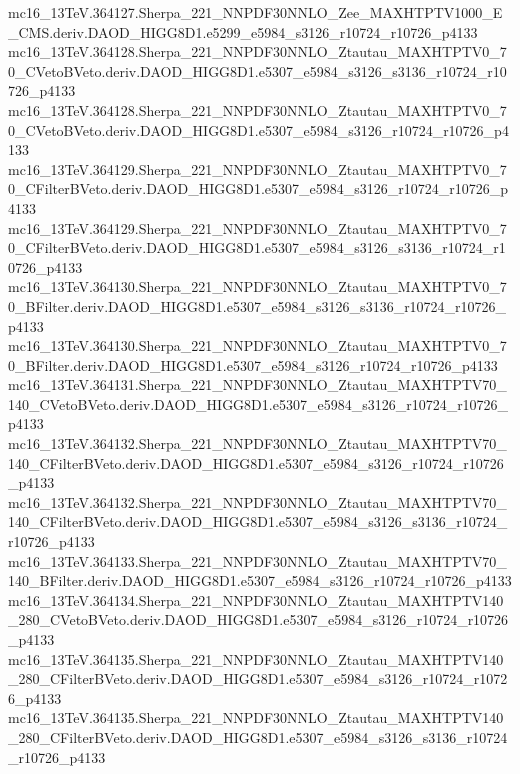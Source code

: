 \begin{scriptsize}
mc16\_13TeV.364127.Sherpa\_221\_NNPDF30NNLO\_Zee\_MAXHTPTV1000\_E\_CMS.deriv.DAOD\_HIGG8D1.e5299\_e5984\_s3126\_r10724\_r10726\_p4133 \\
mc16\_13TeV.364128.Sherpa\_221\_NNPDF30NNLO\_Ztautau\_MAXHTPTV0\_70\_CVetoBVeto.deriv.DAOD\_HIGG8D1.e5307\_e5984\_s3126\_s3136\_r10724\_r10726\_p4133 \\
mc16\_13TeV.364128.Sherpa\_221\_NNPDF30NNLO\_Ztautau\_MAXHTPTV0\_70\_CVetoBVeto.deriv.DAOD\_HIGG8D1.e5307\_e5984\_s3126\_r10724\_r10726\_p4133 \\
mc16\_13TeV.364129.Sherpa\_221\_NNPDF30NNLO\_Ztautau\_MAXHTPTV0\_70\_CFilterBVeto.deriv.DAOD\_HIGG8D1.e5307\_e5984\_s3126\_r10724\_r10726\_p4133 \\
mc16\_13TeV.364129.Sherpa\_221\_NNPDF30NNLO\_Ztautau\_MAXHTPTV0\_70\_CFilterBVeto.deriv.DAOD\_HIGG8D1.e5307\_e5984\_s3126\_s3136\_r10724\_r10726\_p4133 \\
mc16\_13TeV.364130.Sherpa\_221\_NNPDF30NNLO\_Ztautau\_MAXHTPTV0\_70\_BFilter.deriv.DAOD\_HIGG8D1.e5307\_e5984\_s3126\_s3136\_r10724\_r10726\_p4133 \\
mc16\_13TeV.364130.Sherpa\_221\_NNPDF30NNLO\_Ztautau\_MAXHTPTV0\_70\_BFilter.deriv.DAOD\_HIGG8D1.e5307\_e5984\_s3126\_r10724\_r10726\_p4133 \\
mc16\_13TeV.364131.Sherpa\_221\_NNPDF30NNLO\_Ztautau\_MAXHTPTV70\_140\_CVetoBVeto.deriv.DAOD\_HIGG8D1.e5307\_e5984\_s3126\_r10724\_r10726\_p4133 \\
mc16\_13TeV.364132.Sherpa\_221\_NNPDF30NNLO\_Ztautau\_MAXHTPTV70\_140\_CFilterBVeto.deriv.DAOD\_HIGG8D1.e5307\_e5984\_s3126\_r10724\_r10726\_p4133 \\
mc16\_13TeV.364132.Sherpa\_221\_NNPDF30NNLO\_Ztautau\_MAXHTPTV70\_140\_CFilterBVeto.deriv.DAOD\_HIGG8D1.e5307\_e5984\_s3126\_s3136\_r10724\_r10726\_p4133 \\
mc16\_13TeV.364133.Sherpa\_221\_NNPDF30NNLO\_Ztautau\_MAXHTPTV70\_140\_BFilter.deriv.DAOD\_HIGG8D1.e5307\_e5984\_s3126\_r10724\_r10726\_p4133 \\
mc16\_13TeV.364134.Sherpa\_221\_NNPDF30NNLO\_Ztautau\_MAXHTPTV140\_280\_CVetoBVeto.deriv.DAOD\_HIGG8D1.e5307\_e5984\_s3126\_r10724\_r10726\_p4133 \\
mc16\_13TeV.364135.Sherpa\_221\_NNPDF30NNLO\_Ztautau\_MAXHTPTV140\_280\_CFilterBVeto.deriv.DAOD\_HIGG8D1.e5307\_e5984\_s3126\_r10724\_r10726\_p4133 \\
mc16\_13TeV.364135.Sherpa\_221\_NNPDF30NNLO\_Ztautau\_MAXHTPTV140\_280\_CFilterBVeto.deriv.DAOD\_HIGG8D1.e5307\_e5984\_s3126\_s3136\_r10724\_r10726\_p4133 \\

\end{scriptsize}
